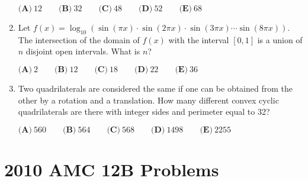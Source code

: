 \documentclass{article}
\begin{document}
\begin{enumerate}[label=\arabic*., itemsep=0.5em]
\(\textbf{(A)}\ 12 \qquad \textbf{(B)}\ 32 \qquad \textbf{(C)}\ 48 \qquad \textbf{(D)}\ 52 \qquad \textbf{(E)}\ 68\)\par \vspace{0.5em}\item Let \(f(x) = \log_{10} \left(\sin(\pi x) \cdot \sin(2 \pi x) \cdot \sin (3 \pi x) \cdots \sin(8 \pi x)\right)\). The intersection of the domain of \(f(x)\) with the interval \([0,1]\) is a union of \(n\) disjoint open intervals. What is \(n\)?

\(\textbf{(A)}\ 2 \qquad \textbf{(B)}\ 12 \qquad \textbf{(C)}\ 18 \qquad \textbf{(D)}\ 22 \qquad \textbf{(E)}\ 36\)\par \vspace{0.5em}\item Two quadrilaterals are considered the same if one can be obtained from the other by a rotation and a translation. How many different convex cyclic quadrilaterals are there with integer sides and perimeter equal to 32?

\(\textbf{(A)}\ 560 \qquad \textbf{(B)}\ 564 \qquad \textbf{(C)}\ 568 \qquad \textbf{(D)}\ 1498 \qquad \textbf{(E)}\ 2255\)\par \vspace{0.5em}
\end{enumerate}
\newpage\section*{2010 AMC 12B Problems}
\end{document}
